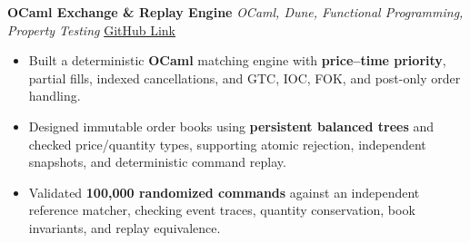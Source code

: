 \textbf{OCaml Exchange \& Replay Engine} \textit{OCaml, Dune, Functional Programming, Property Testing}
\hfill \href{https://github.com/sanskar-ucal/OCaml-Exchange-Replay-Engine}{GitHub Link}
{\descfont
\begin{itemize}
    \item Built a deterministic \textbf{OCaml} matching engine with \textbf{price--time priority}, partial fills, indexed cancellations, and GTC, IOC, FOK, and post-only order handling.
    \item Designed immutable order books using \textbf{persistent balanced trees} and checked price/quantity types, supporting atomic rejection, independent snapshots, and deterministic command replay.
    \item Validated \textbf{100,000 randomized commands} against an independent reference matcher, checking event traces, quantity conservation, book invariants, and replay equivalence.
\end{itemize}
}
